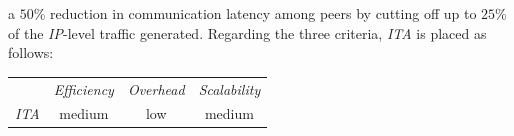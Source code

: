 a $50$\% reduction in communication latency among peers by cutting off up to 
$25$\% of the \emph{IP}-level traffic generated.
Regarding the three criteria, \emph{ITA} is placed as follows:
%
\begin{center}
{\footnotesize
\begin{tabular}{rccc}
\multicolumn{1}{r}{} &
\multicolumn{1}{c}{\emph{Efficiency}} &
\multicolumn{1}{c}{\emph{Overhead}} &
\multicolumn{1}{c}{\emph{Scalability}}
\\
\cline{2-4}
\emph{ITA} &
medium &
low &
medium
\end{tabular}
}
\end{center}

